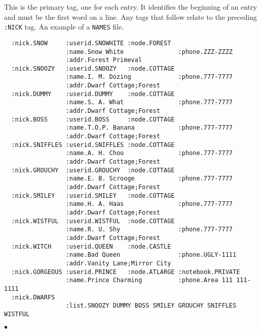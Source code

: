 This is the primary tag, one for each entry. It identifies the
beginning of an entry and must be the first word on a line.
Any tags that follow relate to the preceding {\tt :NICK} tag.
\newpage
\Examples
An example of a {\tt NAMES} file.
\begin{verbatim}
  :nick.SNOW     :userid.SNOWHITE :node.FOREST
                 :name.Snow White               :phone.ZZZ-ZZZZ
                 :addr.Forest Primeval
  :nick.SNOOZY   :userid.SNOOZY   :node.COTTAGE
                 :name.I. M. Dozing             :phone.777-7777
                 :addr.Dwarf Cottage;Forest
  :nick.DUMMY    :userid.DUMMY    :node.COTTAGE
                 :name.S. A. What               :phone.777-7777
                 :addr.Dwarf Cottage;Forest
  :nick.BOSS     :userid.BOSS     :node.COTTAGE
                 :name.T.O.P. Banana            :phone.777-7777
                 :addr.Dwarf Cottage;Forest
  :nick.SNIFFLES :userid.SNIFFLES :node.COTTAGE
                 :name.A. H. Choo               :phone.777-7777
                 :addr.Dwarf Cottage;Forest
  :nick.GROUCHY  :userid.GROUCHY  :node.COTTAGE
                 :name.E. B. Scrooge            :phone.777-7777
                 :addr.Dwarf Cottage;Forest
  :nick.SMILEY   :userid.SMILEY   :node.COTTAGE
                 :name.H. A. Haas               :phone.777-7777
                 :addr.Dwarf Cottage;Forest
  :nick.WISTFUL  :userid.WISTFUL  :node.COTTAGE
                 :name.R. U. Shy                :phone.777-7777
                 :addr.Dwarf Cottage;Forest
  :nick.WITCH    :userid.QUEEN    :node.CASTLE
                 :name.Bad Queen                :phone.UGLY-1111
                 :addr.Vanity Lane;Mirror City
  :nick.GORGEOUS :userid.PRINCE   :node.ATLARGE :notebook.PRIVATE
                 :name.Prince Charming          :phone.Area 111 111-1111
  :nick.DWARFS
                 :list.SNOOZY DUMMY BOSS SMILEY GROUCHY SNIFFLES WISTFUL
\end{verbatim}
$\bullet$
